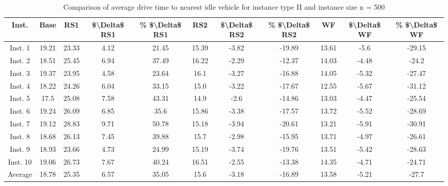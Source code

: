 \begin{table}[H]
\centering
\begin{tabular}{ccccccccccc}
  \hline
  \textbf{Inst.} & \textbf{Base} & \textbf{RS1} & \textbf{\$\textbackslash{}Delta\$  RS1} & \textbf{\% \$\textbackslash{}Delta\$  RS1} & \textbf{RS2} & \textbf{\$\textbackslash{}Delta\$  RS2} & \textbf{\% \$\textbackslash{}Delta\$  RS2} & \textbf{WF} & \textbf{\$\textbackslash{}Delta\$  WF} & \textbf{\% \$\textbackslash{}Delta\$  WF} \\\hline
  Inst. 1 & 19.21 & 23.33 & 4.12 & 21.45 & 15.39 & -3.82 & -19.89 & 13.61 & -5.6 & -29.15 \\
  Inst. 2 & 18.51 & 25.45 & 6.94 & 37.49 & 16.22 & -2.29 & -12.37 & 14.03 & -4.48 & -24.2 \\
  Inst. 3 & 19.37 & 23.95 & 4.58 & 23.64 & 16.1 & -3.27 & -16.88 & 14.05 & -5.32 & -27.47 \\
  Inst. 4 & 18.22 & 24.26 & 6.04 & 33.15 & 15.0 & -3.22 & -17.67 & 12.55 & -5.67 & -31.12 \\
  Inst. 5 & 17.5 & 25.08 & 7.58 & 43.31 & 14.9 & -2.6 & -14.86 & 13.03 & -4.47 & -25.54 \\
  Inst. 6 & 19.24 & 26.09 & 6.85 & 35.6 & 15.86 & -3.38 & -17.57 & 13.72 & -5.52 & -28.69 \\
  Inst. 7 & 19.12 & 28.83 & 9.71 & 50.78 & 15.18 & -3.94 & -20.61 & 13.21 & -5.91 & -30.91 \\
  Inst. 8 & 18.68 & 26.13 & 7.45 & 39.88 & 15.7 & -2.98 & -15.95 & 13.71 & -4.97 & -26.61 \\
  Inst. 9 & 18.93 & 23.66 & 4.73 & 24.99 & 15.19 & -3.74 & -19.76 & 13.51 & -5.42 & -28.63 \\
  Inst. 10 & 19.06 & 26.73 & 7.67 & 40.24 & 16.51 & -2.55 & -13.38 & 14.35 & -4.71 & -24.71 \\
  Average & 18.78 & 25.35 & 6.57 & 35.05 & 15.6 & -3.18 & -16.89 & 13.58 & -5.21 & -27.7 \\\hline
\end{tabular}
\caption{Comparison of average drive time to nearest idle vehicle for instance type II and instance size n = 500}
\label{tab:wait:resrelocation-nearest-drive-time-comparison_II_500}
\end{table}

